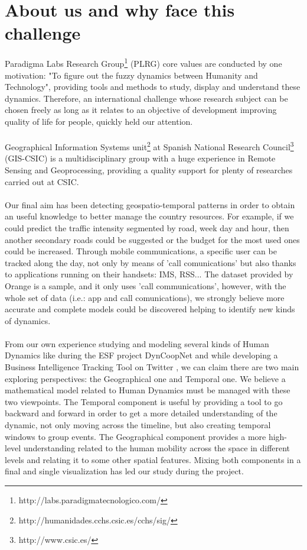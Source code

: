 \newpage

\section{About us and why face this challenge}
Paradigma Labs Research Group\footnote{http://labs.paradigmatecnologico.com/} (PLRG) core values are conducted by one motivation: "To figure out the fuzzy dynamics between Humanity and Technology", providing tools and methods to study, display and understand these dynamics. Therefore, an international challenge whose research subject can be chosen freely as long as it relates to an objective of development improving quality of life for people, quickly held our attention.
\\
\\
Geographical Information Systems unit\footnote{http://humanidades.cchs.csic.es/cchs/sig/} at Spanish National Research Council\footnote{http://www.csic.es/} (GIS-CSIC) is a multidisciplinary group with a huge experience in Remote Sensing and Geoprocessing, providing a quality support for plenty of researches carried out at CSIC.
\\
\\
Our final aim has been detecting geospatio-temporal patterns in order to obtain an useful knowledge to better manage the country resources. For example, if we could predict the traffic intensity segmented by road, week day and hour, then another secondary roads could be suggested or the budget for the most used ones could be increased. Through mobile communications, a specific user can be tracked along the day, not only by means of 'call comunications' but also thanks to applications running on their handsets: IMS, RSS... The dataset provided by Orange is a sample, and it only uses 'call communications', however, with the whole set of data (i.e.: app and call comunications), we strongly believe more accurate and complete models could be discovered helping to identify new kinds of dynamics.
\\
\\
From our own experience studying and modeling several kinds of Human Dynamics like during the ESF project DynCoopNet\citep{dyncoopnet2012} and while developing a Business Intelligence Tracking Tool on Twitter \citep{labselecciones}, we can claim there are two main exploring perspectives: the Geographical one and Temporal one. We believe a mathematical model related to Human Dynamics must be managed with these two viewpoints. The Temporal component is useful by providing a tool to go backward and forward in order to get a more detailed understanding of the dynamic, not only moving across the timeline, but also creating temporal windows to group events. The Geographical component provides a more high-level understanding related to the human mobility across the space in different levels and relating it to some other spatial features. Mixing both components in a final and single visualization has led our study during the project.
